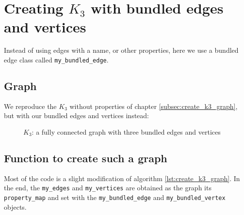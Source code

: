 \section{Creating $K_{3}$  with bundled edges and vertices}
\label{subsec:create_bundled_edges_and_vertices_k3}

Instead of using edges with a name, or other properties, here we use a bundled
edge class called \verb;my_bundled_edge;.

\subsection{Graph}

We reproduce the $K_{3}$ without properties of chapter 
\ref{subsec:create_k3_graph}, but with our bundled edges and vertices instead:

\begin{figure}
  \caption{$K_{3}$: a fully connected graph with three bundled edges and vertices }
  \label{fig:create_bundled_edges_and_vertices_k3}
\end{figure}

\subsection{Function to create such a graph}



Most of the code is a slight modification of algorithm 
\ref{lst:create_k3_graph}.
In the end, the \verb;my_edges; and \verb;my_vertices; are obtained as the graph its
\verb;property_map; and set with the \verb;my_bundled_edge; 
and \verb;my_bundled_vertex; objects.


